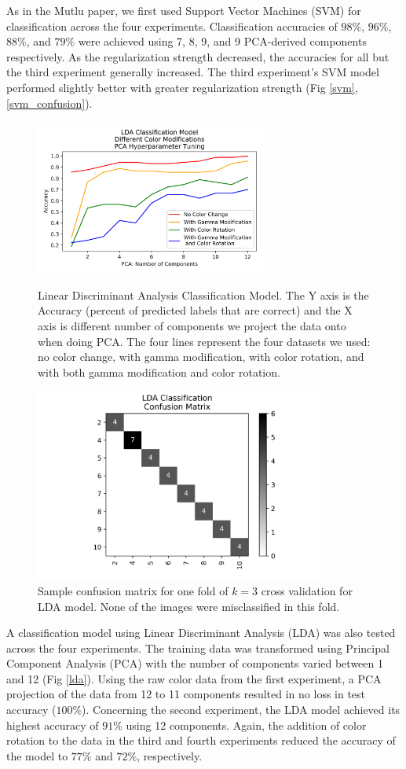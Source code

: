 \documentclass[journal]{IEEEtran}
\begin{document}
As in the Mutlu paper, we first used Support Vector Machines (SVM) for classification across the four experiments. Classification accuracies of $98\%$, $96\%$, $88\%$, and $79\%$ were achieved using 7, 8, 9, and 9 PCA-derived components respectively. As the regularization strength decreased, the accuracies for all but the third experiment generally increased. The third experiment’s SVM model performed slightly better with greater regularization strength (Fig \ref{svm}, \ref{svm_confusion}).

\begin{figure}
\centering
\includegraphics[height=2in]{LDA/lda_classification.png}
\caption{Linear Discriminant Analysis Classification Model. The Y axis is the Accuracy (percent of predicted labels that are correct) and the X axis is different number of components we project the data onto when doing PCA. The four lines represent the four datasets we used: no color change, with gamma modification, with color rotation, and with both gamma modification and color rotation.}
\label{lda}

\centering
\includegraphics[height=2.5in]{LDA/LDA_classification_cfm.png}
\caption{Sample confusion matrix for one fold of $k=3$ cross validation for LDA model. None of the images were misclassified in this fold.}
\label{lda_confusion}
\end{figure}

A classification model using Linear Discriminant Analysis (LDA) was also tested across the four experiments. The training data was transformed using Principal Component Analysis (PCA) with the number of components varied between 1 and 12 (Fig \ref{lda}). Using the raw color data from the first experiment, a PCA projection of the data from 12 to 11 components resulted in no loss in test accuracy ($100\%$). Concerning the second experiment, the LDA model achieved its highest accuracy of $91\%$ using 12 components. Again, the addition of color rotation to the data in the third and fourth experiments reduced the accuracy of the model to $77\%$ and $72\%$, respectively.
\end{document}
